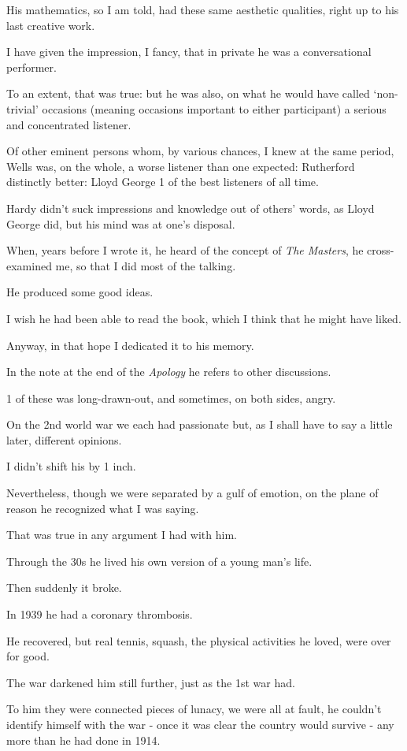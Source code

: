 \documentclass{article}
\numberwithin{equation}{section}
\begin{document}
His mathematics, so I am told, had these same aesthetic qualities, right up to his last creative work.

I have given the impression, I fancy, that in private he was a conversational performer.

To an extent, that was true: but he was also, on what he would have called `non-trivial' occasions (meaning occasions important to either participant) a serious and concentrated listener.

Of other eminent persons whom, by various chances,  I knew at the same period, Wells was, on the whole, a worse listener than one expected: Rutherford distinctly better: Lloyd George 1 of the best listeners of all time.

Hardy didn't suck impressions and knowledge out of others' words, as Lloyd George did, but his mind was at one's disposal.

When, years before I wrote it, he heard of the concept of \textit{The Masters}, he cross-examined me, so that I did most of the talking.

He produced some good ideas.

I wish he had been able to read the book, which I think that he might have liked.

Anyway, in that hope I dedicated it to his memory.

%
In the note at the end of the \textit{Apology} he refers to other discussions.

1 of these was long-drawn-out, and sometimes, on both sides, angry.

On the 2nd world war we each had passionate but, as I shall have to say a little later, different opinions.

I didn't shift his by 1 inch.

Nevertheless, though we were separated by a gulf of emotion, on the plane of reason he recognized what I was saying.

That was true in any argument I had with him.

%
Through the 30s he lived his own version of a young man's life.

Then suddenly it broke.

In 1939 he had a coronary thrombosis.

He recovered, but real tennis, squash, the physical activities he loved, were over for good.

The war darkened him still further, just as the 1st war had.

To him they were connected pieces of lunacy, we were all at fault, he couldn't identify himself with the war - once it was clear the country would survive - any more than he had done in 1914.
\end{document}
